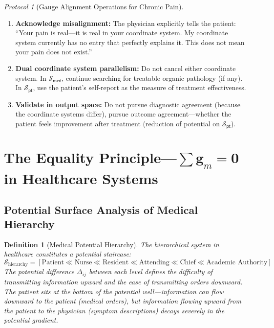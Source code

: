 \documentclass[12pt,a4paper]{article}
\newtheorem{definition}[theorem]{Definition}
\theoremstyle{remark}
\newtheorem{protocol}[theorem]{Protocol}
\newcommand{\med}{\textsf{med}}
\newcommand{\pt}{\textsf{pt}}
\begin{document}
\begin{protocol}[Gauge Alignment Operations for Chronic Pain]\label{prot:chronic_pain}
\begin{enumerate}[label=(\arabic*),itemsep=3pt]
    \item \textbf{Acknowledge misalignment:} The physician explicitly tells the patient: ``Your pain is real---it is real in your coordinate system. My coordinate system currently has no entry that perfectly explains it. This does not mean your pain does not exist.''
    \item \textbf{Dual coordinate system parallelism:} Do not cancel either coordinate system. In $\mathcal{S}_{\med}$, continue searching for treatable organic pathology (if any). In $\mathcal{S}_{\pt}$, use the patient's self-report as the measure of treatment effectiveness.
    \item \textbf{Validate in output space:} Do not pursue diagnostic agreement (because the coordinate systems differ), pursue outcome agreement---whether the patient feels improvement after treatment (reduction of potential on $\mathcal{S}_{\pt}$).
\end{enumerate}
\end{protocol}

\section{The Equality Principle---$\sum \mathbf{g}_m = \mathbf{0}$ in Healthcare Systems}
\label{sec:equality_medicine}

\subsection{Potential Surface Analysis of Medical Hierarchy}

\begin{definition}[Medical Potential Hierarchy]\label{def:medical_hierarchy}
The hierarchical system in healthcare constitutes a potential staircase:
\begin{equation}
    \mathcal{S}_{\text{hierarchy}} = [
    \text{Patient} \ll \text{Nurse} \ll \text{Resident} \ll \text{Attending} \ll \text{Chief} \ll \text{Academic Authority}
    ]
\end{equation}
The potential difference $\Delta_{ij}$ between each level defines the difficulty of transmitting information upward and the ease of transmitting orders downward. The patient sits at the bottom of the potential well---information can flow downward to the patient (medical orders), but information flowing upward from the patient to the physician (symptom descriptions) decays severely in the potential gradient.
\end{definition}
\end{document}
